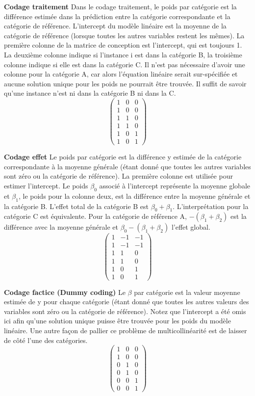 \textbf{Codage traitement}
Dans le codage traitement, le poids par catégorie est la différence estimée dans la prédiction entre la catégorie correspondante et la catégorie de référence. L'intercept du modèle linéaire est la moyenne de la catégorie de référence (lorsque toutes les autres variables restent les mêmes). La première colonne de la matrice de conception est l'intercept, qui est toujours 1. La deuxième colonne indique si l'instance i est dans la catégorie B, la troisième colonne indique si elle est dans la catégorie C. Il n'est pas nécessaire d'avoir une colonne pour la catégorie A, car alors l'équation linéaire serait sur-spécifiée et aucune solution unique pour les poids ne pourrait être trouvée. Il suffit de savoir qu'une instance n'est ni dans la catégorie B ni dans la C.
\[ 
\begin{pmatrix} 1 & 0 & 0 \\ 1 & 0 & 0 \\ 1 & 1 & 0 \\ 1 & 1 & 0 \\ 1 & 0 & 1 \\ 1 & 0 & 1 \end{pmatrix} 
\]

\textbf{Codage effet}
Le poids par catégorie est la différence y estimée de la catégorie correspondante à la moyenne générale (étant donné que toutes les autres variables sont zéro ou la catégorie de référence). La première colonne est utilisée pour estimer l'intercept. Le poids \(\beta_{0}\) associé à l'intercept représente la moyenne globale et \(\beta_{1}\), le poids pour la colonne deux, est la différence entre la moyenne générale et la catégorie B. L'effet total de la catégorie B est \(\beta_{0}+\beta_{1}\). L'interprétation pour la catégorie C est équivalente. Pour la catégorie de référence A, \(-(\beta_{1}+\beta_{2})\) est la différence avec la moyenne générale et \(\beta_{0}-(\beta_{1}+\beta_{2})\) l'effet global.
\[ 
\begin{pmatrix} 1 & -1 & -1 \\ 1 & -1 & -1 \\ 1 & 1 & 0 \\ 1 & 1 & 0 \\ 1 & 0 & 1 \\ 1 & 0 & 1 \end{pmatrix} 
\]

\textbf{Codage factice (Dummy coding)}
Le \(\beta\) par catégorie est la valeur moyenne estimée de y pour chaque catégorie (étant donné que toutes les autres valeurs des variables sont zéro ou la catégorie de référence). Notez que l'intercept a été omis ici afin qu'une solution unique puisse être trouvée pour les poids du modèle linéaire. Une autre façon de pallier ce problème de multicollinéarité est de laisser de côté l'une des catégories.
\[ 
\begin{pmatrix} 1 & 0 & 0 \\ 1 & 0 & 0 \\ 0 & 1 & 0 \\ 0 & 1 & 0 \\ 0 & 0 & 1 \\ 0 & 0 & 1 \end{pmatrix} 
\]

